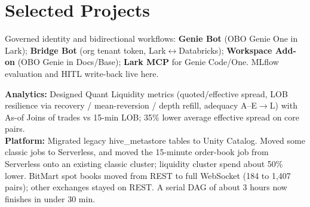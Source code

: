 \documentclass[letterpaper]{deedy-resume}
\begin{document}
\begin{minipage}[t]{0.66\textwidth}
\sectionspace

\section{Selected Projects}
\vspace{1mm}

\runsubsection{}
Governed identity and bidirectional workflows: \textbf{Genie Bot} (OBO Genie One in Lark); \textbf{Bridge Bot} (org tenant token, Lark$\leftrightarrow$Databricks); \textbf{Workspace Add-on} (OBO Genie in Docs/Base); \textbf{Lark MCP} for Genie Code/One. MLflow evaluation and HITL write-back live here.

\sectionspace

\runsubsection{}
\textbf{Analytics:} Designed Quant Liquidity metrics (quoted/effective spread, LOB resilience via recovery / mean-reversion / depth refill, adequacy A--E$\to$L) with As-of Joins of trades vs 15-min LOB; 35\% lower average effective spread on core pairs. \\
\textbf{Platform:} Migrated legacy hive\_metastore tables to Unity Catalog. Moved some classic jobs to Serverless, and moved the 15-minute order-book job from Serverless onto an existing classic cluster; liquidity cluster spend about 50\% lower. BitMart spot books moved from REST to full WebSocket (184 to 1,407 pairs); other exchanges stayed on REST. A serial DAG of about 3 hours now finishes in under 30 min.

\end{minipage}
\end{document}
